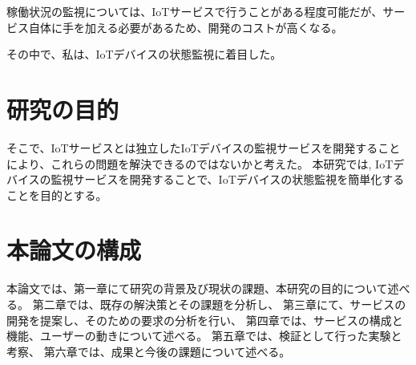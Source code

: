 稼働状況の監視については、IoTサービスで行うことがある程度可能だが、サービス自体に手を加える必要があるため、開発のコストが高くなる。

その中で、私は、IoTデバイスの状態監視に着目した。

\section{研究の目的}
そこで、IoTサービスとは独立したIoTデバイスの監視サービスを開発することにより、これらの問題を解決できるのではないかと考えた。
本研究では, IoTデバイスの監視サービスを開発することで、IoTデバイスの状態監視を簡単化することを目的とする。


\section{本論文の構成}
本論文では、第一章にて研究の背景及び現状の課題、本研究の目的について述べる。
第二章では、既存の解決策とその課題を分析し、
第三章にて、サービスの開発を提案し、そのための要求の分析を行い、
第四章では、サービスの構成と機能、ユーザーの動きについて述べる。
第五章では、検証として行った実験と考察、
第六章では、成果と今後の課題について述べる。
